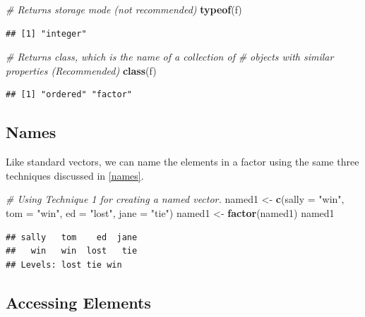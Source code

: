 \documentclass[
]{book}
\newenvironment{Shaded}{\begin{snugshade}}{\end{snugshade}}
\newcommand{\CommentTok}[1]{\textcolor[rgb]{0.56,0.35,0.01}{\textit{#1}}}
\newcommand{\DataTypeTok}[1]{\textcolor[rgb]{0.13,0.29,0.53}{#1}}
\newcommand{\KeywordTok}[1]{\textcolor[rgb]{0.13,0.29,0.53}{\textbf{#1}}}
\newcommand{\NormalTok}[1]{#1}
\newcommand{\StringTok}[1]{\textcolor[rgb]{0.31,0.60,0.02}{#1}}
\begin{document}
\begin{Shaded}
\begin{Highlighting}[]
\CommentTok{# Returns storage mode (not recommended)}
\KeywordTok{typeof}\NormalTok{(f)}
\end{Highlighting}
\end{Shaded}

\begin{verbatim}
## [1] "integer"
\end{verbatim}

\begin{Shaded}
\begin{Highlighting}[]
\CommentTok{# Returns class, which is the name of a collection of}
\CommentTok{# objects with similar properties (Recommended)}
\KeywordTok{class}\NormalTok{(f)}
\end{Highlighting}
\end{Shaded}

\begin{verbatim}
## [1] "ordered" "factor"
\end{verbatim}

\hypertarget{names-1}{%
\subsection{Names}\label{names-1}}

Like standard vectors, we can name the elements in a factor using the same three techniques discussed in \ref{names}.

\begin{Shaded}
\begin{Highlighting}[]
\CommentTok{# Using Technique 1 for creating a named vector.}
\NormalTok{named1 <-}\StringTok{ }\KeywordTok{c}\NormalTok{(}\DataTypeTok{sally =} \StringTok{"win"}\NormalTok{, }\DataTypeTok{tom =} \StringTok{"win"}\NormalTok{, }\DataTypeTok{ed =} \StringTok{"lost"}\NormalTok{, }\DataTypeTok{jane =} \StringTok{"tie"}\NormalTok{)}
\NormalTok{named1 <-}\StringTok{ }\KeywordTok{factor}\NormalTok{(named1)}
\NormalTok{named1}
\end{Highlighting}
\end{Shaded}

\begin{verbatim}
## sally   tom    ed  jane 
##   win   win  lost   tie 
## Levels: lost tie win
\end{verbatim}

\hypertarget{accessing-elements}{%
\subsection{Accessing Elements}\label{accessing-elements}}
\end{document}
